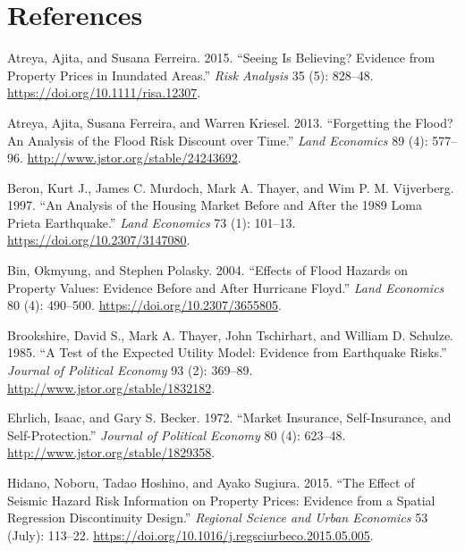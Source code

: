 \documentclass[
  letterpaper,
  DIV=11,
  numbers=noendperiod]{scrartcl}
\newlength{\cslhangindent}
\newenvironment{CSLReferences}[2] %
 {\begin{list}{}{%
  \setlength{\itemindent}{0pt}
  \setlength{\leftmargin}{0pt}
  \setlength{\parsep}{0pt}
  \ifodd #1
   \setlength{\leftmargin}{\cslhangindent}
   \setlength{\itemindent}{-1\cslhangindent}
  \fi
  \setlength{\itemsep}{#2\baselineskip}}}
 {\end{list}}
\begin{document}
\section{References}

\label{refs}
\begin{CSLReferences}{1}{0}
Atreya, Ajita, and Susana Ferreira. 2015. {``Seeing Is {Believing}?
{Evidence} from {Property} {Prices} in {Inundated} {Areas}.''}
\emph{Risk Analysis} 35 (5): 828--48.
\url{https://doi.org/10.1111/risa.12307}.

Atreya, Ajita, Susana Ferreira, and Warren Kriesel. 2013. {``Forgetting
the {Flood}? {An} {Analysis} of the {Flood} {Risk} {Discount} over
{Time}.''} \emph{Land Economics} 89 (4): 577--96.
\url{http://www.jstor.org/stable/24243692}.

Beron, Kurt J., James C. Murdoch, Mark A. Thayer, and Wim P. M.
Vijverberg. 1997. {``An {Analysis} of the {Housing} {Market} Before and
After the 1989 {Loma} {Prieta} {Earthquake}.''} \emph{Land Economics} 73
(1): 101--13. \url{https://doi.org/10.2307/3147080}.

Bin, Okmyung, and Stephen Polasky. 2004. {``Effects of {Flood} {Hazards}
on {Property} {Values}: {Evidence} Before and After {Hurricane}
{Floyd}.''} \emph{Land Economics} 80 (4): 490--500.
\url{https://doi.org/10.2307/3655805}.

Brookshire, David S., Mark A. Thayer, John Tschirhart, and William D.
Schulze. 1985. {``A {Test} of the {Expected} {Utility} {Model}:
{Evidence} from {Earthquake} {Risks}.''} \emph{Journal of Political
Economy} 93 (2): 369--89. \url{http://www.jstor.org/stable/1832182}.

Ehrlich, Isaac, and Gary S. Becker. 1972. {``Market Insurance,
Self-Insurance, and Self-Protection.''} \emph{Journal of Political
Economy} 80 (4): 623--48. \url{http://www.jstor.org/stable/1829358}.

Hidano, Noboru, Tadao Hoshino, and Ayako Sugiura. 2015. {``The Effect of
Seismic Hazard Risk Information on Property Prices: {Evidence} from a
Spatial Regression Discontinuity Design.''} \emph{Regional Science and
Urban Economics} 53 (July): 113--22.
\url{https://doi.org/10.1016/j.regsciurbeco.2015.05.005}.


\end{CSLReferences}
\end{document}
